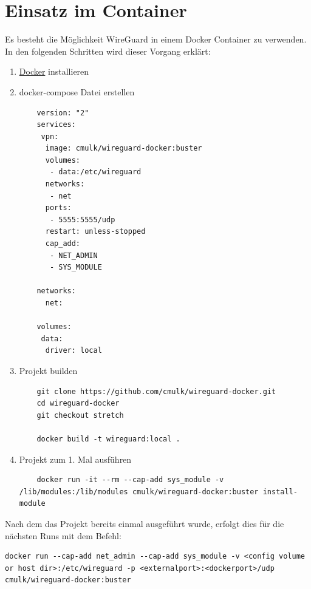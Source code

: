 \section{Einsatz im Container}
Es besteht die Möglichkeit WireGuard in einem Docker Container zu verwenden. In den folgenden Schritten wird dieser Vorgang erklärt:
\begin{enumerate}
    \item \href{https://docs.docker.com/docker-for-windows/install/}{Docker} installieren
    \item docker-compose Datei erstellen \newline
    \begin{lstlisting}
    version: "2"
    services:
     vpn:
      image: cmulk/wireguard-docker:buster
      volumes:
       - data:/etc/wireguard
      networks:
       - net
      ports:
       - 5555:5555/udp
      restart: unless-stopped
      cap_add:
       - NET_ADMIN
       - SYS_MODULE
    
    networks:
      net:
    
    volumes:
     data:
      driver: local
    \end{lstlisting}
    \item Projekt builden
    \begin{lstlisting}
    git clone https://github.com/cmulk/wireguard-docker.git
    cd wireguard-docker
    git checkout stretch 
    
    docker build -t wireguard:local .
    \end{lstlisting}
    \item Projekt zum 1. Mal ausführen
    \begin{lstlisting}
    docker run -it --rm --cap-add sys_module -v /lib/modules:/lib/modules cmulk/wireguard-docker:buster install-module 
    \end{lstlisting}
\end{enumerate}
Nach dem das Projekt bereits einmal ausgeführt wurde, erfolgt dies für die nächsten Runs mit dem Befehl:
\begin{lstlisting}
docker run --cap-add net_admin --cap-add sys_module -v <config volume or host dir>:/etc/wireguard -p <externalport>:<dockerport>/udp cmulk/wireguard-docker:buster
\end{lstlisting}

